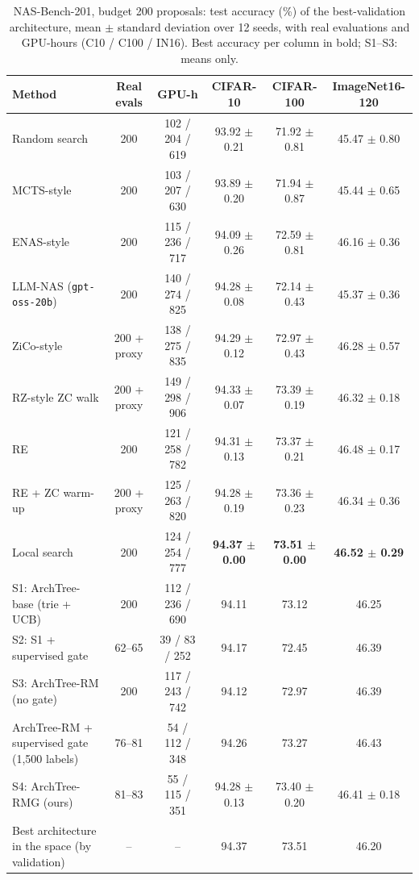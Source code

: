 \documentclass{sadhana}
\newcommand{\algname}{ArchTree}
\newcommand{\rmg}{ArchTree-RMG}
\begin{document}
\begin{table}[t]
\caption{NAS-Bench-201, budget 200 proposals: test accuracy (\%) of the best-validation architecture, mean $\pm$ standard deviation over 12 seeds, with real evaluations and GPU-hours (C10 / C100 / IN16). Best accuracy per column in bold; S1--S3: means only.}\label{tab:main}
\centering\footnotesize
\begin{tabular}{@{}lccccc@{}}
\toprule
Method & Real evals & GPU-h & CIFAR-10 & CIFAR-100 & ImageNet16-120\\
\midrule
Random search \cite{li2020random} & 200 & 102 / 204 / 619 & 93.92 $\pm$ 0.21 & 71.92 $\pm$ 0.81 & 45.47 $\pm$ 0.80\\
MCTS-style \cite{wang2020alphax} & 200 & 103 / 207 / 630 & 93.89 $\pm$ 0.20 & 71.94 $\pm$ 0.87 & 45.44 $\pm$ 0.65\\
ENAS-style \cite{pham2018} & 200 & 115 / 236 / 717 & 94.09 $\pm$ 0.26 & 72.59 $\pm$ 0.81 & 46.16 $\pm$ 0.36\\
LLM-NAS (\texttt{gpt-oss-20b}) & 200 & 140 / 274 / 825 & 94.28 $\pm$ 0.08 & 72.14 $\pm$ 0.43 & 45.37 $\pm$ 0.36\\
ZiCo-style \cite{li2023zico} & 200 + proxy & 138 / 275 / 835 & 94.29 $\pm$ 0.12 & 72.97 $\pm$ 0.43 & 46.28 $\pm$ 0.57\\
RZ-style ZC walk & 200 + proxy & 149 / 298 / 906 & 94.33 $\pm$ 0.07 & 73.39 $\pm$ 0.19 & 46.32 $\pm$ 0.18\\
RE \cite{real2019} & 200 & 121 / 258 / 782 & 94.31 $\pm$ 0.13 & 73.37 $\pm$ 0.21 & 46.48 $\pm$ 0.17\\
RE + ZC warm-up \cite{abdelfattah2021} & 200 + proxy & 125 / 263 / 820 & 94.28 $\pm$ 0.19 & 73.36 $\pm$ 0.23 & 46.34 $\pm$ 0.36\\
Local search \cite{white2021ls} & 200 & 124 / 254 / 777 & \textbf{94.37 $\pm$ 0.00} & \textbf{73.51 $\pm$ 0.00} & \textbf{46.52 $\pm$ 0.29}\\
\midrule
S1: \algname-base (trie + UCB) & 200 & 112 / 236 / 690 & 94.11 & 73.12 & 46.25\\
S2: S1 + supervised gate & 62--65 & 39 / 83 / 252 & 94.17 & 72.45 & 46.39\\
S3: \algname-RM (no gate) & 200 & 117 / 243 / 742 & 94.12 & 72.97 & 46.39\\
\algname-RM + supervised gate (1,500 labels) & 76--81 & 54 / 112 / 348 & 94.26 & 73.27 & 46.43\\
S4: \rmg{} (ours) & 81--83 & 55 / 115 / 351 & 94.28 $\pm$ 0.13 & 73.40 $\pm$ 0.20 & 46.41 $\pm$ 0.18\\
\midrule
Best architecture in the space (by validation) & -- & -- & 94.37 & 73.51 & 46.20\\
\bottomrule
\end{tabular}
\end{table}
\end{document}
